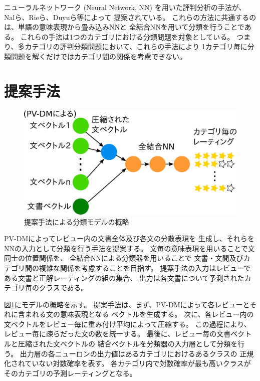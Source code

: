 \documentclass{ttisummary}
\makeatletter
\let\tti@includegraphics\includegraphics
\renewcommand{\includegraphics}[1]{\tti@includegraphics[width=\linewidth]{#1}}
\makeatother
\begin{document}
ニューラルネットワーク (Neural Network, NN) を用いた評判分析の手法が、
Nalら\cite{nal14}、Rieら\cite{rie14}、Duyuら\cite{duyu15}等によって
提案されている。
これらの方法に共通するのは、単語の意味表現から畳み込みNNと
全結合NNを用いて分類を行うことである。
これらの手法は1つのカテゴリにおける分類問題を対象としている。
つまり、多カテゴリの評判分類問題において、これらの手法により
1カテゴリ毎に分類問題を解くだけではカテゴリ間の関係を考慮できない。



\section{提案手法}

\begin{figure}[t!]
  \includegraphics{fig/model.png}
  \caption{提案手法による分類モデルの概略}
  \label{fig:MyModel}
\end{figure}

PV-DMによってレビュー内の文書全体及び各文の分散表現を
生成し、それらをNNの入力として分類を行う手法を提案する。
文毎の意味表現を用いることで文同士の位置関係を、
全結合NNによる分類器を用いることで
文書・文間及びカテゴリ間の複雑な関係を考慮することを目指す。
提案手法の入力はレビューである文書と正解レーティングの組の集合、
出力は各文書について予測されたカテゴリ毎のクラスである。

図\ref{fig:MyModel}にモデルの概略を示す。
提案手法は、まず、PV-DMによって各レビューとそれに含まれる文の意味表現となる
ベクトルを生成する。
次に、各レビュー内の文ベクトルをレビュー毎に重み付け平均によって圧縮する。
この過程により、レビュー毎に疎らだった文の数を統一する。
最後に、レビュー毎の文書ベクトルと圧縮された文ベクトルの
結合ベクトルを分類器の入力層として分類を行う。
出力層の各ニューロンの出力値はあるカテゴリにおけるあるクラスの
正規化されていない対数確率を表す。
各カテゴリ内で対数確率が最も高いクラスがそのカテゴリの予測レーティングとなる。
\end{document}
